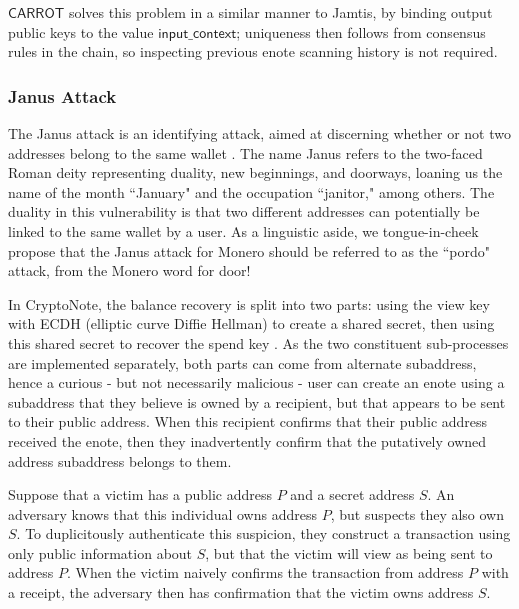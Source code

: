 \documentclass{article}
\theoremstyle{definition}
\newcommand{\6}{\mathbf}
\newcommand{\7}{\mathcal}
\renewcommand{\sf}[1]{{\mathsf{#1}}}
\newcommand{\carr}{$\sf{CARROT}$ }
\begin{document}
\carr solves this problem in a similar manner to Jamtis, by binding output public keys to the value $\sf{input\_context}$; uniqueness then follows from consensus rules in the chain, so inspecting previous enote scanning history is not required. 








\subsubsection{Janus Attack}\label{sec:janus}

The Janus attack is an identifying attack, aimed at discerning whether or not two addresses belong to the same wallet \cite{Janus,BreakingMoneroJanus}.
The name Janus refers to the two-faced Roman deity representing duality, new beginnings, and doorways, loaning us the name of the month ``January" and the occupation ``janitor," among others.
The duality in this vulnerability is that two different addresses can potentially be linked to the same wallet by a user.
As a linguistic aside, we tongue-in-cheek propose that the Janus attack for Monero should be referred to as the ``pordo" attack, from the Monero word for door!
\medskip 

In CryptoNote, the balance recovery is split into two parts: using the view key with ECDH (elliptic curve Diffie Hellman) to create a shared secret, then using this shared secret to recover the spend key \cite{CryptoNote}. 
As the two constituent sub-processes are implemented separately, both parts can come from alternate subaddress, hence a curious - but not necessarily malicious - user can create an enote using a subaddress that they believe is owned by a recipient, but that appears to be sent to their public address.
When this recipient confirms that their public address received the enote, then they inadvertently confirm that the putatively owned address subaddress belongs to them. 
\medskip 

Suppose that a victim has a public address $P$ and a secret address $S$. An adversary knows that this individual owns address $P$, but suspects they also own $S$. To duplicitously authenticate this suspicion, they construct a transaction using only public information about $S$, but that the victim will view as being sent to address $P$. When the victim naively confirms the transaction from address $P$ with a receipt, the adversary then has confirmation that the victim owns address $S$.
\medskip 
\end{document}
